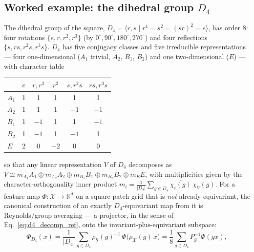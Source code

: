 \documentclass[11pt]{article}
\begin{document}
\subsection{Worked example: the dihedral group $D_4$}
The dihedral group of the square, $D_4 = \langle r,s \mid r^4=s^2=(sr)^2=e\rangle$, has order $8$: four rotations $\{e,r,r^2,r^3\}$ (by $0^\circ,90^\circ,180^\circ,270^\circ$) and four reflections $\{s,rs,r^2s,r^3s\}$. $D_4$ has five conjugacy classes and five irreducible representations — four one-dimensional ($A_1$ trivial, $A_2$, $B_1$, $B_2$) and one two-dimensional ($E$) — with character table
\begin{center}
\begin{tabular}{lccccc}
\toprule
& $e$ & $r,r^3$ & $r^2$ & $s,r^2s$ & $rs,r^3s$ \\
\midrule
$A_1$ & 1 & 1 & 1 & 1 & 1 \\
$A_2$ & 1 & 1 & 1 & $-1$ & $-1$ \\
$B_1$ & 1 & $-1$ & 1 & 1 & $-1$ \\
$B_2$ & 1 & $-1$ & 1 & $-1$ & 1 \\
$E$ & 2 & 0 & $-2$ & 0 & 0 \\
\bottomrule
\end{tabular}
\end{center}
so that any linear representation $V$ of $D_4$ decomposes as $V \cong m_{A_1} A_1 \oplus m_{A_2} A_2 \oplus m_{B_1} B_1 \oplus m_{B_2} B_2 \oplus m_E E$, with multiplicities given by the character-orthogonality inner product $m_i = \frac{1}{|D_4|}\sum_{g\in D_4}\overline{\chi_i(g)}\,\chi_V(g)$. For a feature map $\Phi:\mathcal{X}\to\mathbb{R}^d$ on a square patch grid that is \emph{not} already equivariant, the canonical construction of an exactly $D_4$-equivariant map from it is Reynolds/group averaging — a projector, in the sense of Eq.~\eqref{eq:d4_decomp_ref}, onto the invariant-plus-equivariant subspace:
\begin{equation}
\Phi_{D_4}(x) = \frac{1}{|D_4|}\sum_{g\in D_4} \rho_{\mathcal{Y}}(g)^{-1}\, \Phi\bigl(\rho_{\mathcal{X}}(g)\, x\bigr) = \frac{1}{8}\sum_{g\in D_4} P_g^{-1}\Phi(gx),
\label{eq:reynolds}
\end{equation}
\end{document}
